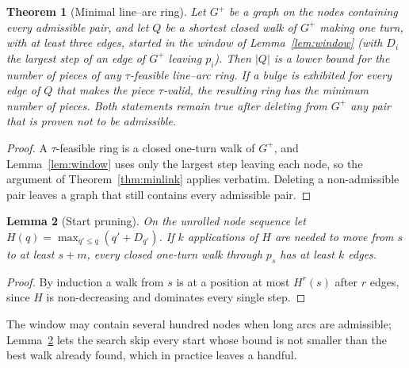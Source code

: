 \documentclass[11pt,a4paper]{article}
\newtheorem{theorem}{Theorem}
\newtheorem{lemma}[theorem]{Lemma}
\theoremstyle{definition}
\theoremstyle{remark}
\begin{document}
\begin{theorem}[Minimal line--arc ring]\label{thm:arcs}
Let $G^{+}$ be a graph on the nodes containing every admissible pair, and let
$Q$ be a shortest closed walk of $G^{+}$ making one turn, with at least three
edges, started in the window of Lemma~\ref{lem:window} (with $D_i$ the largest
step of an edge of $G^{+}$ leaving $p_i$). Then $\lvert Q\rvert$ is a lower
bound for the number of pieces of any $\tau$-feasible line--arc ring. If a
bulge is exhibited for every edge of $Q$ that makes the piece $\tau$-valid,
the resulting ring has the minimum number of pieces. Both statements remain
true after deleting from $G^{+}$ any pair that is proven not to be admissible.
\end{theorem}
\begin{proof}
A $\tau$-feasible ring is a closed one-turn walk of $G^{+}$, and
Lemma~\ref{lem:window} uses only the largest step leaving each node, so the
argument of Theorem~\ref{thm:minlink} applies verbatim. Deleting a
non-admissible pair leaves a graph that still contains every admissible pair.
\end{proof}

\begin{lemma}[Start pruning]\label{lem:hull}
On the unrolled node sequence let $H(q)=\max_{q'\le q}(q'+D_{q'})$. If $k$
applications of $H$ are needed to move from $s$ to at least $s+m$, every closed
one-turn walk through $p_s$ has at least $k$ edges.
\end{lemma}
\begin{proof}
By induction a walk from $s$ is at a position at most $H^{r}(s)$ after $r$
edges, since $H$ is non-decreasing and dominates every single step.
\end{proof}

The window may contain several hundred nodes when long arcs are admissible;
Lemma~\ref{lem:hull} lets the search skip every start whose bound is not
smaller than the best walk already found, which in practice leaves a handful.
\end{document}

